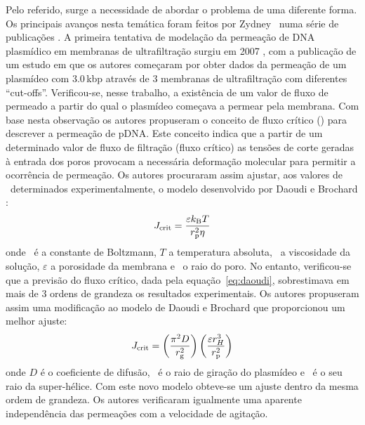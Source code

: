 Pelo referido, surge a necessidade de abordar o problema de uma diferente forma. Os principais avanços nesta temática foram feitos por Zydney \et\ numa série de publicações \cite{latu07,latu09,latusalt,latuiecr,ager,zydneyiso}. 
A primeira tentativa de modelação da permeação de DNA plasmídico em membranas de ultrafiltração surgiu em 2007 \cite{latu07}, com a publicação de um estudo em que os autores começaram por obter dados da permeação de um plasmídeo com 3.0\,kbp através de 3 membranas de ultrafiltração com diferentes ``cut-offs''. Verificou-se, nesse trabalho, a existência de um valor de fluxo de permeado a partir do qual o plasmídeo começava a permear pela membrana. Com base nesta observação os autores propuseram o conceito de fluxo crítico (\fluxocritico) para descrever a permeação de pDNA. 
Este conceito indica que a partir de um determinado valor de fluxo de filtração (fluxo crítico) as tensões de corte geradas à entrada dos poros provocam a necessária deformação molecular para permitir a ocorrência de permeação. Os autores procuraram assim ajustar, aos valores de \fluxocritico\ determinados experimentalmente, o modelo desenvolvido por Daoudi e Brochard \cite{daoudi}:
\begin{equation}
\label{eq:daoudi}
J_{\mathrm{crit}}=\frac{\varepsilon k_{\mathrm{B}} T}{r_{\mathrm{p}}^{2}\eta}
\end{equation}
onde \boltzman\ é a constante de Boltzmann, $T$ a temperatura absoluta, \viscosidade\ a viscosidade da solução, $\varepsilon$ a porosidade da membrana e \raioporo\ o raio do poro. No entanto, verificou-se que a previsão do fluxo crítico, dada pela equação~\ref{eq:daoudi}, sobrestimava em mais de 3 ordens de grandeza os resultados experimentais. Os autores propuseram assim uma modificação ao modelo de Daoudi e Brochard que proporcionou um melhor ajuste:
\begin{equation}
\label{eq:latu07}
J_{\mathrm{crit}}=\left(\frac{\pi^{2}D}{r_{\mathrm{g}}^{2}}\right)\left(\frac{\varepsilon r_{H}^{3}}{r_{\mathrm{p}}^{2}}\right)
\end{equation}
onde $D$ é o coeficiente de difusão, \raiogiracao\ é o raio de giração do plasmídeo e \raiosuperhelice\ é o seu raio da super-hélice. Com este novo modelo obteve-se um ajuste dentro da mesma ordem de grandeza. Os autores verificaram igualmente uma aparente independência das permeações com a velocidade de agitação. 

